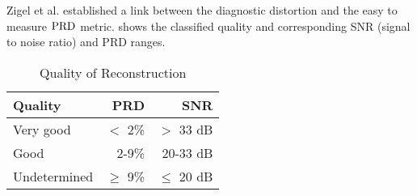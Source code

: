Zigel et al. \cite{zigel2000weighted} established 
a link between the diagnostic distortion and
the easy to measure $\mathrm{PRD}$ metric.
 shows the classified quality
and corresponding SNR (signal to noise ratio) and PRD ranges.
\begin{table}[ht]
\centering
\caption{Quality of Reconstruction \cite{zigel2000weighted}}
\begin{tabular}{lrr}
\toprule
Quality & PRD & SNR \\
\midrule 
Very good & $<$ 2\% & $>$ 33 dB \\
Good & 2-9\% & 20-33 dB \\
Undetermined & $\geq$ 9\% & $\leq$ 20 dB\\
\bottomrule
\end{tabular}
\label{tbl:quality:prd:snr}
\end{table}
